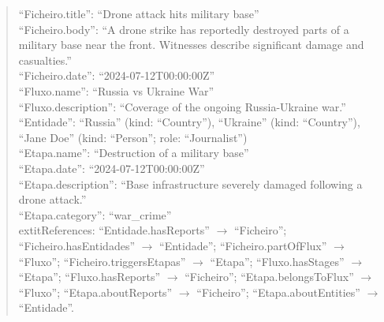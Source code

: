 \begin{quote}
\enquote{Ficheiro.title}: \enquote{Drone attack hits military base}\\
\enquote{Ficheiro.body}: \enquote{A drone strike has reportedly destroyed parts of a military base near the front. Witnesses describe significant damage and casualties.}\\
\enquote{Ficheiro.date}: \enquote{2024-07-12T00:00:00Z}\\
\enquote{Fluxo.name}: \enquote{Russia vs Ukraine War}\\
\enquote{Fluxo.description}: \enquote{Coverage of the ongoing Russia-Ukraine war.}\\
\enquote{Entidade}: \enquote{Russia} (kind: \enquote{Country}), \enquote{Ukraine} (kind: \enquote{Country}), \enquote{Jane Doe} (kind: \enquote{Person}; role: \enquote{Journalist})\\
\enquote{Etapa.name}: \enquote{Destruction of a military base}\\
\enquote{Etapa.date}: \enquote{2024-07-12T00:00:00Z}\\
\enquote{Etapa.description}: \enquote{Base infrastructure severely damaged following a drone attack.}\\
\enquote{Etapa.category}: \enquote{war\_crime}\\
	extit{References}: \enquote{Entidade.hasReports} $\rightarrow$ \enquote{Ficheiro}; \enquote{Ficheiro.hasEntidades} $\rightarrow$ \enquote{Entidade}; \enquote{Ficheiro.partOfFlux} $\rightarrow$ \enquote{Fluxo}; \enquote{Ficheiro.triggersEtapas} $\rightarrow$ \enquote{Etapa}; \enquote{Fluxo.hasStages} $\rightarrow$ \enquote{Etapa}; \enquote{Fluxo.hasReports} $\rightarrow$ \enquote{Ficheiro}; \enquote{Etapa.belongsToFlux} $\rightarrow$ \enquote{Fluxo}; \enquote{Etapa.aboutReports} $\rightarrow$ \enquote{Ficheiro}; \enquote{Etapa.aboutEntities} $\rightarrow$ \enquote{Entidade}.
\end{quote}


